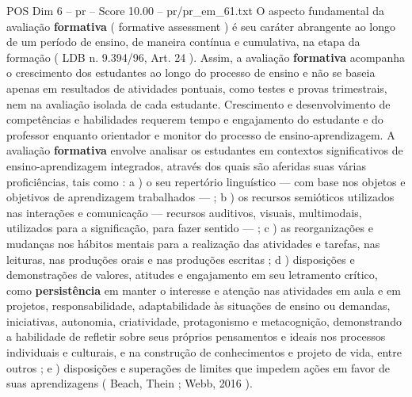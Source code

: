 \begin{textsample}{POS Dim 6 – pr – Score 10.00 – pr/pr\_em\_61.txt}
O aspecto fundamental da avaliação \textbf{formativa} ( formative assessment ) é seu caráter abrangente ao longo de um período de ensino, de maneira contínua e cumulativa, na etapa da formação ( LDB n. 9.394/96, Art. 24 ).
Assim, a avaliação \textbf{formativa} acompanha o crescimento dos estudantes ao longo do processo de ensino e não se baseia apenas em resultados de atividades pontuais, como testes e provas trimestrais, nem na avaliação isolada de cada estudante.
Crescimento e desenvolvimento de competências e habilidades requerem tempo e engajamento do estudante e do professor enquanto orientador e monitor do processo de ensino-aprendizagem.
A avaliação \textbf{formativa} envolve analisar os estudantes em contextos significativos de ensino-aprendizagem integrados, através dos quais são aferidas suas várias proficiências, tais como : a ) o seu repertório linguístico — com base nos objetos e objetivos de aprendizagem trabalhados — ; b ) os recursos semióticos utilizados nas interações e comunicação — recursos auditivos, visuais, multimodais, utilizados para a significação, para fazer sentido — ; c ) as reorganizações e mudanças nos hábitos mentais para a realização das atividades e tarefas, nas leituras, nas produções orais e nas produções escritas ; d ) disposições e demonstrações de valores, atitudes e engajamento em seu letramento crítico, como \textbf{persistência} em manter o interesse e atenção nas atividades em aula e em projetos, responsabilidade, adaptabilidade às situações de ensino ou demandas, iniciativas, autonomia, criatividade, protagonismo e metacognição, demonstrando a habilidade de refletir sobre seus próprios pensamentos e ideais nos processos individuais e culturais, e na construção de conhecimentos e projeto de vida, entre outros ; e ) disposições e superações de limites que impedem ações em favor de suas aprendizagens ( Beach, Thein ; Webb, 2016 ).

\end{textsample}
